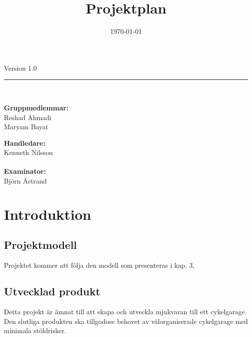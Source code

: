 \documentclass[a4paper]{article}
\title{Projektplan}
\date{\today}
\begin{document}
\maketitle

\begin{center}

\large{Version 1.0}   			%
\ \\[1cm]
\hrule
\ \\[1cm]
\begin{minipage}{0.5\textwidth}
	\begin{flushleft} \large
		\textbf{Gruppmedlemmar:} \\
		Reshad Ahmadi \\
		Maryam Bayat \\		
	\end{flushleft}
\end{minipage}

\begin{minipage}{0.4\textwidth}
	\begin{flushright} \large
		\textbf{Handledare:} \\
		Kenneth Nilsson \\
		\ \\				
		\textbf{Examinator:} \\
		Björn Åstrand
	\end{flushright}
\end{minipage}

\end{center}

\clearpage

\tableofcontents
\newpage

\section{Introduktion}


\subsection{Projektmodell} %
Projektet kommer att följa den modell som presenteras i kap. 3, 

\subsection{Utvecklad produkt} %
Detta projekt är ämnat till att skapa och utveckla mjukvaran till ett cykelgarage. Den slutliga produkten ska
 tillgodose behovet av välorganiserade cykelgarage med minimala stöldrisker.
\end{document}
